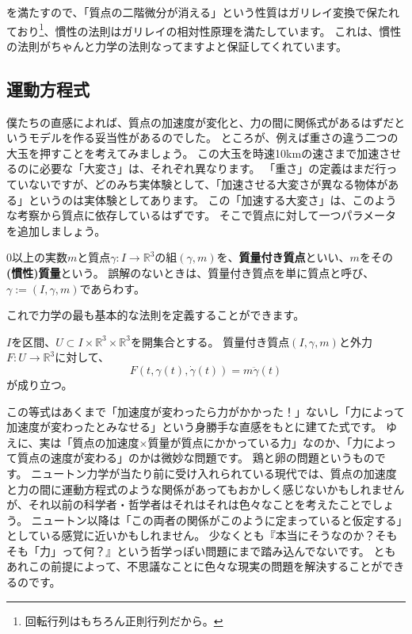 を満たすので、「質点の二階微分が消える」という性質はガリレイ変換で保たれており\footnote{
  回転行列はもちろん正則行列だから。
}、慣性の法則はガリレイの相対性原理を満たしています。
これは、慣性の法則がちゃんと力学の法則なってますよと保証してくれています。

\subsection{運動方程式}

僕たちの直感によれば、質点の加速度が変化と、力の間に関係式があるはずだというモデルを作る妥当性があるのでした。
ところが、例えば重さの違う二つの大玉を押すことを考えてみましょう。
この大玉を時速10kmの速さまで加速させるのに必要な「大変さ」は、それぞれ異なります。
「重さ」の定義はまだ行っていないですが、どのみち実体験として、「加速させる大変さが異なる物体がある」というのは実体験としてあります。
この「加速する大変さ」は、このような考察から質点に依存しているはずです。
そこで質点に対して一つパラメータを追加しましょう。

\begin{definition}[慣性質量]
  0以上の実数$m$と質点$\gamma:I\to\mathbb{R}^3$の組$(\gamma,m)$を、\textbf{質量付き質点}といい、$m$をその\textbf{(慣性)質量}という。
  誤解のないときは、質量付き質点を単に質点と呼び、$\gamma:=(I,\gamma,m)$であらわす。
\end{definition}

これで力学の最も基本的な法則を定義することができます。
\begin{definition}[運動方程式]
  $I$を区間、$U\subset I\times\mathbb{R}^3\times\mathbb{R}^3$を開集合とする。
  質量付き質点$(I,\gamma,m)$と外力$F:U\to\mathbb{R}^3$に対して、
  \[
    F(t,\gamma(t),\dot\gamma(t))=m\ddot\gamma(t)
  \]
  が成り立つ。
\end{definition}

この等式はあくまで「加速度が変わったら力がかかった！」ないし「力によって加速度が変わったとみなせる」という身勝手な直感をもとに建てた式です。
ゆえに、実は「質点の加速度×質量が質点にかかっている力」なのか、「力によって質点の速度が変わる」のかは微妙な問題です。
鶏と卵の問題というものです。
ニュートン力学が当たり前に受け入れられている現代では、質点の加速度と力の間に運動方程式のような関係があってもおかしく感じないかもしれませんが、それ以前の科学者・哲学者はそれはそれは色々なことを考えたことでしょう。
ニュートン以降は「この両者の関係がこのように定まっていると仮定する」としている感覚に近いかもしれません。
少なくとも『本当にそうなのか？そもそも「力」って何？』という哲学っぽい問題にまで踏み込んでないです。
ともあれこの前提によって、不思議なことに色々な現実の問題を解決することができるのです。

